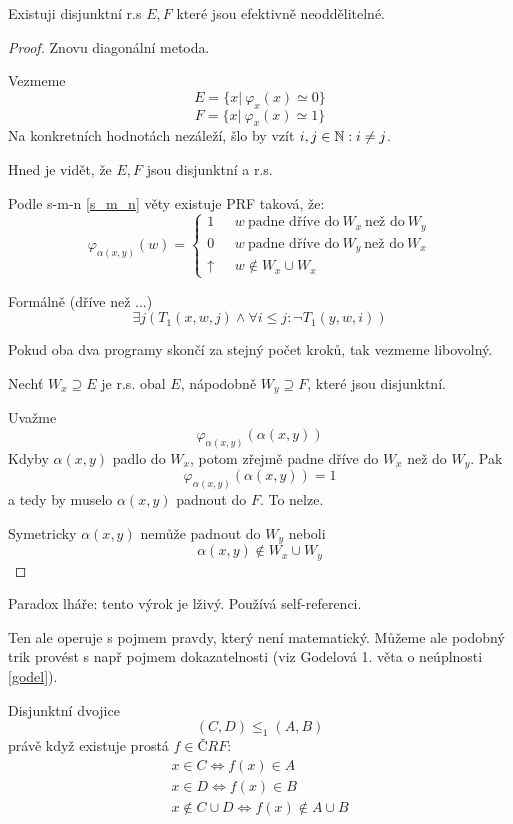 \begin{theorem}
	Existuji disjunktní r.s $E, F$ které jsou efektivně neoddělitelné.
\end{theorem}
\begin{proof}
	Znovu diagonální metoda.

	Vezmeme
	\[ E = \{ x|\ \varphi_x(x) \simeq 0 \} \]
	\[ F = \{ x|\ \varphi_x(x) \simeq 1 \} \]
	Na konkretních hodnotách nezáleží, šlo by vzít $i, j \in \operatorname{\mathbb{N}}: i \ne j$.

	Hned je vidět, že $E, F$ jsou disjunktní a r.s.

	Podle s-m-n \cref{s_m_n} věty existuje PRF taková, že:
	\[ \varphi_{\alpha(x, y)} (w) =
		\left\{
		\begin{array}{lll}
			1 & \mbox{ } w \ \text{padne dříve do} \ W_x \ \text{než do} \ W_y \\
			0 & \mbox{ } w \ \text{padne dříve do} \ W_y \ \text{než do} \ W_x \\
			\uparrow & \mbox{ } w \notin W_x \cup W_x
		\end{array}
		\right.
	\]

	Formálně (dříve než ...)
	\[ \exists j (T_1(x, w, j) \land \forall i \leq j: \neg T_1(y, w, i)) \]

	Pokud oba dva programy skončí za stejný počet kroků, tak vezmeme libovolný.

	Nechť $W_x \supseteq E$ je r.s. obal $E$, nápodobně $W_y \supseteq F$, které jsou disjunktní.

	Uvažme
	\[ \varphi_{\alpha(x, y)}(\alpha(x, y)) \]
	Kdyby $\alpha(x, y)$ padlo do $W_x$, potom zřejmě padne dříve do $W_x$ než do $W_y$.
	Pak
	\[ \varphi_{\alpha(x, y)}(\alpha(x, y)) = 1 \]
	a tedy by muselo $\alpha(x, y)$ padnout do $F$. To nelze.

	Symetricky $\alpha(x, y)$ nemůže padnout do $W_y$ neboli
	\[ \alpha(x, y) \notin W_x \cup W_y \]

\end{proof}

\begin{note}
	Paradox lháře: tento výrok je lživý.
	Používá self-referenci.

	Ten ale operuje s pojmem pravdy, který není matematický.
	Můžeme ale podobný trik provést s např pojmem dokazatelnosti (viz Godelová 1. věta o neúplnosti \cref{godel}).
\end{note}

\begin{definition}
	Disjunktní dvojice
	\[ (C, D) \leq_1 (A, B) \]
	právě když existuje prostá $f \in ČRF$:
	\begin{gather*}
		x \in C \iff f(x) \in A\\
		x \in D \iff f(x) \in B\\
		x \notin C \cup D \iff f(x) \notin A \cup B
	\end{gather*}
\end{definition}

